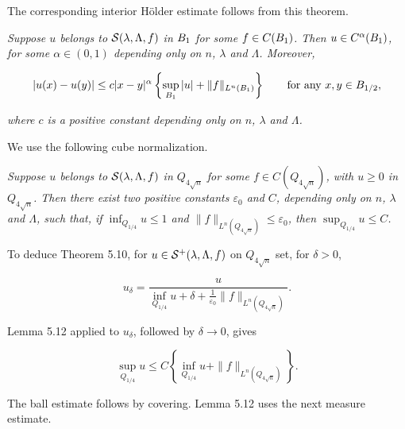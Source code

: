 The corresponding interior Hölder estimate follows from this theorem.

\medskip

\begin{corollary}\label{hanlin:ch05-cor-5-11} \textit{Suppose $u$ belongs to $\mathcal{S}(\lambda,\Lambda,f)$ in $B_1$ for some $f\in C(B_1)$. Then $u\in C^\alpha(B_1)$, for some $\alpha\in (0,1)$ depending only on $n$, $\lambda$ and $\Lambda$. Moreover,}

\[
|u(x)-u(y)| \leq c|x-y|^\alpha \left\{\sup_{B_1} |u| + \|f\|_{L^n(B_1)}\right\} \qquad \text{for any } x,y\in B_{1/2},
\]

\textit{where $c$ is a positive constant depending only on $n$, $\lambda$ and $\Lambda$.}
\end{corollary}

We use the following cube normalization.

\medskip

\begin{lemma}\label{hanlin:ch05-lem-5-12} \textit{Suppose $u$ belongs to $\mathcal{S}(\lambda,\Lambda,f)$ in $Q_{4\sqrt{n}}$ for some $f\in C(Q_{4\sqrt{n}})$, with $u\geq 0$ in $Q_{4\sqrt{n}}$. Then there exist two positive constants $\varepsilon_0$ and $C$, depending only on $n$, $\lambda$ and $\Lambda$, such that, if $\inf_{Q_{1/4}} u \leq 1$ and $\|f\|_{L^n(Q_{4\sqrt{n}})} \leq \varepsilon_0$, then $\sup_{Q_{1/4}} u \leq C$.}
\end{lemma}

To deduce Theorem 5.10, for $u \in \mathcal{S}^{+}(\lambda,\Lambda,f)$ on $Q_{4\sqrt n}$ set, for $\delta>0$,

\[
u_{\delta}=\frac{u}{\inf_{Q_{1/4}} u+\delta+\frac{1}{\varepsilon_{0}}\|f\|_{L^{n}(Q_{4\sqrt{n}})}}.
\]

Lemma 5.12 applied to $u_\delta$, followed by $\delta\to0$, gives

\[
\sup_{Q_{1/4}} u \leq C\left\{\inf_{Q_{1/4}} u+\|f\|_{L^{n}(Q_{4\sqrt{n}})}\right\}.
\]

The ball estimate follows by covering. Lemma 5.12 uses the next measure estimate.

\medskip

